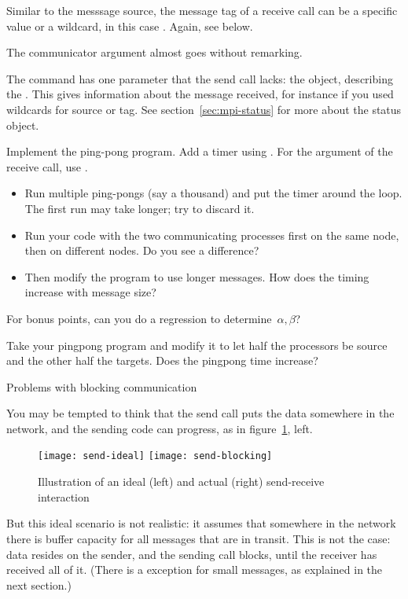 Similar to the messsage source, the message tag of a receive call can
be a specific value or a wildcard, in this case
.
Again, see below.

The communicator argument almost goes without remarking.

The  command has one parameter that
the send call lacks: the  object,
describing the .
This gives information about the message received,
for instance if you used wildcards for source or tag.
See section~\ref{sec:mpi-status}
for more about the status object.

\begin{exercise}
  \label{ex:pingpong}
  Implement the ping-pong program. Add a timer using .
  For the  argument of the receive call, use
  .

  \begin{itemize}
  \item Run multiple ping-pongs (say a thousand) and put the timer
    around the loop. The first run may take longer; try to discard it.
  \item Run your code with the two communicating processes first on
    the same node, then on different nodes. Do you see a difference?
  \item Then modify the program
    to use longer messages. How does the timing increase with message size?
  \end{itemize}
  For bonus points, can you do a regression to determine~$\alpha,\beta$?
\end{exercise}

\begin{exercise}
  \label{ex:hbwpingpong}
  Take your pingpong program and modify it 
  to let half the processors
  be source and the other half the targets. Does the pingpong time increase?
\end{exercise}

 {Problems with blocking communication}
\label{sec:blocking}

You may be tempted to think that the send call puts the data somewhere
in the network, and the sending code can progress,
as in figure~\ref{fig:send-ideal}, left.
%
\begin{figure}[ht]
\leavevmode
\texttt{[image: send-ideal]}
\texttt{[image: send-blocking]}
\caption{Illustration of an ideal (left) and actual (right) send-receive interaction}
\label{fig:send-ideal}
\end{figure}
%
But this ideal scenario is not realistic: it assumes that somewhere
in the network there is buffer capacity for all messages that are in
transit.
This is not the case: data resides on the sender, and the sending call blocks,
until the receiver has received all of it. (There is a exception for
small messages, as explained in the next section.)

